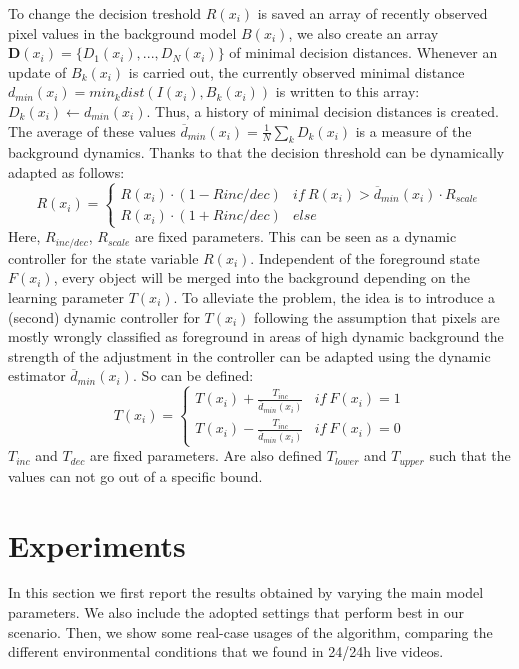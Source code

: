 To change the decision treshold $R(x_i)$ is saved an array of recently observed pixel values in the background model $B(x_i)$, we also create an array $\mathbf{D}(x_i) = \{D_1(x_i ),...,D_N(x_i)\}$ of minimal decision distances. Whenever an update of $B_k(x_i)$ is carried out, the currently observed minimal distance $d_{min}(x_i) = min_k dist(I(x_i), B_k(x_i))$ is written to this array: $D_k(x_i) \leftarrow d_{min}(x_i)$. Thus, a history of minimal decision distances is created. The average of these values $\overline{d}_{min}(x_i) = \frac{1}{N} \sum_k D_k(x_i)$ is a measure of the background dynamics. Thanks to that
the decision threshold can be dynamically adapted as follows:
\begin{equation}
R(x_i)=\begin{cases} R(x_i)\cdot(1-R{inc/dec}) &if\ R(x_i)> \overline{d}_{min}(x_i)\cdot R_{scale} \\ R(x_i)\cdot (1+R{inc/dec}) &else  \end{cases}
\end{equation}
Here, $R_{inc/dec}$, $R_{scale}$ are fixed parameters. This can be seen as a dynamic controller for the state variable $R(x_i)$.
\newline
Independent of the foreground state $F(x_i)$, every object will be merged into the background depending on the learning parameter
$T(x_i)$. To alleviate the problem, the idea is to introduce a
(second) dynamic controller for $T(x_i)$ following the assumption that pixels are mostly wrongly classified as foreground in areas of high dynamic background the strength of the adjustment in the controller can be adapted using the dynamic estimator $\overline{d}_{min}(x_i)$. So can be defined:
\begin{equation}
T(x_i)=\begin{cases} T(x_i)+\frac{T_{inc}}{\overline{d}_{min}(x_i)} &if \ F(x_i)=1 \\ T(x_i)-\frac{T_{inc}}{\overline{d}_{min}(x_i)} &if \ F(x_i)=0 \end{cases}
\end{equation}
$T_{inc}$ and $T_{dec}$ are fixed parameters. Are also defined $T_{lower}$ and $T_{upper}$ such that the values can not go out of a specific bound.


\section*{Experiments}
In this section we first report the results obtained by varying the main model parameters. We also include the
adopted settings that perform best in our scenario. Then, we show some real-case usages of the algorithm,
comparing the different environmental conditions that we found in 24/24h live videos.

